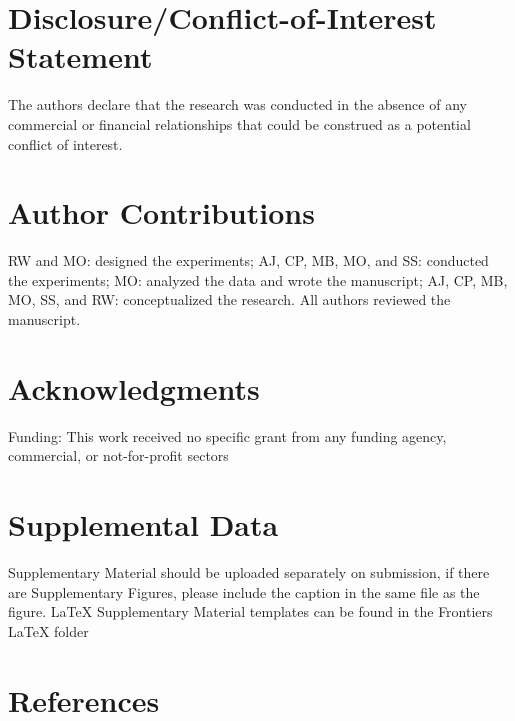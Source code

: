 \documentclass[utf8]{frontiersSCNS}
\begin{document}
\hypertarget{disclosureconflict-of-interest-statement}{%
\section*{Disclosure/Conflict-of-Interest
Statement}\label{disclosureconflict-of-interest-statement}}

The authors declare that the research was conducted in the absence of
any commercial or financial relationships that could be construed as a
potential conflict of interest.

\hypertarget{author-contributions}{%
\section*{Author Contributions}\label{author-contributions}}

RW and MO: designed the experiments; AJ, CP, MB, MO, and SS: conducted
the experiments; MO: analyzed the data and wrote the manuscript; AJ, CP,
MB, MO, SS, and RW: conceptualized the research. All authors reviewed
the manuscript.

\hypertarget{acknowledgments}{%
\section*{Acknowledgments}\label{acknowledgments}}

Funding: This work received no specific grant from any funding agency,
commercial, or not-for-profit sectors

\hypertarget{supplemental-data}{%
\section*{Supplemental Data}\label{supplemental-data}}

Supplementary Material should be uploaded separately on submission, if
there are Supplementary Figures, please include the caption in the same
file as the figure. LaTeX Supplementary Material templates can be found
in the Frontiers LaTeX folder

\hypertarget{references}{%
\section*{References}\label{references}}
\end{document}
